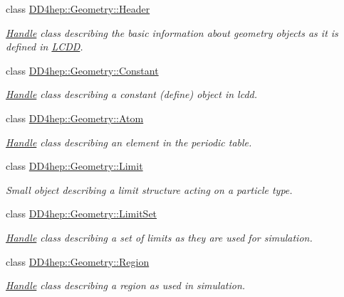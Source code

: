 \begin{DoxyCompactItemize}
class \hyperlink{class_d_d4hep_1_1_geometry_1_1_header}{DD4hep::Geometry::Header}
\begin{DoxyCompactList}\small\item\em \hyperlink{class_d_d4hep_1_1_handle}{Handle} class describing the basic information about geometry objects as it is defined in \hyperlink{class_d_d4hep_1_1_geometry_1_1_l_c_d_d}{LCDD}. \item\end{DoxyCompactList}\item 
class \hyperlink{class_d_d4hep_1_1_geometry_1_1_constant}{DD4hep::Geometry::Constant}
\begin{DoxyCompactList}\small\item\em \hyperlink{class_d_d4hep_1_1_handle}{Handle} class describing a constant (define) object in lcdd. \item\end{DoxyCompactList}\item 
class \hyperlink{class_d_d4hep_1_1_geometry_1_1_atom}{DD4hep::Geometry::Atom}
\begin{DoxyCompactList}\small\item\em \hyperlink{class_d_d4hep_1_1_handle}{Handle} class describing an element in the periodic table. \item\end{DoxyCompactList}\item 
class \hyperlink{class_d_d4hep_1_1_geometry_1_1_limit}{DD4hep::Geometry::Limit}
\begin{DoxyCompactList}\small\item\em Small object describing a limit structure acting on a particle type. \item\end{DoxyCompactList}\item 
class \hyperlink{class_d_d4hep_1_1_geometry_1_1_limit_set}{DD4hep::Geometry::LimitSet}
\begin{DoxyCompactList}\small\item\em \hyperlink{class_d_d4hep_1_1_handle}{Handle} class describing a set of limits as they are used for simulation. \item\end{DoxyCompactList}\item 
class \hyperlink{class_d_d4hep_1_1_geometry_1_1_region}{DD4hep::Geometry::Region}
\begin{DoxyCompactList}\small\item\em \hyperlink{class_d_d4hep_1_1_handle}{Handle} class describing a region as used in simulation. \item\end{DoxyCompactList}\item 

\end{DoxyCompactItemize}
